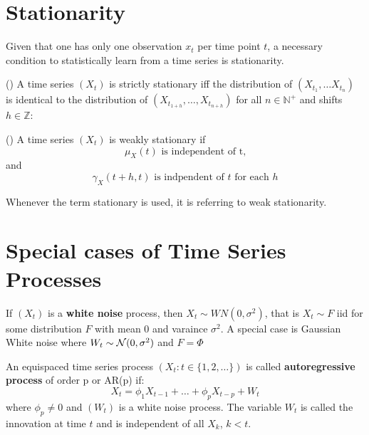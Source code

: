 \section{Stationarity}\label{sec:stationarity}

Given that one has only one observation $x_t$ per time point $t$,
a necessary condition to statistically learn from a time series is stationarity.

\begin{definition}(\citeauthor{brockwell_introduction_2016})
    A time series $(X_t)$ is strictly stationary iff
    the distribution of $(X_{t_1}, \dots X_{t_n})$ is identical to the distribution of
    $(X_{t_{1+h}}, \dots ,X_{t_{n+h}})$ for all $n \in \mathbb{N}^{+}$
    and shifts $h \in \mathbb{Z}$:
\end{definition}


\begin{definition}(\citeauthor{brockwell_introduction_2016})
    A time series $(X_t)$ is weakly stationary if
    \[
        \mu_X(t) \text{ is independent of t,}
    \]
    and
    \[
        \gamma_X(t+h, t) \text{ is indpendent of $t$ for each $h$}
    \]
\end{definition}

Whenever the term stationary is used, it is referring to weak stationarity.

\section{Special cases of Time Series Processes}\label{sec:example-of-time-series-processes}

\begin{example} If $(X_t)$ is a \textbf{white noise} process,
    then $X_t \sim WN(0, \sigma^2)$, that is $X_t \sim F$ iid for some
    distribution $F$ with mean $0$ and varaince $\sigma^2$. A special case is Gaussian White
    noise where $W_t \sim \operatorname{\mathcal{N}}(0, \sigma^2)$ and $F= \Phi$
\end{example}

\begin{example}
    An equispaced time series process $(X_t: t \in \{1,2, \dots\})$ is called \textbf{autoregressive process}
    of order p or AR(p) if:
    \[
        X_t = \phi_1 X_{t-1} + \dots + \phi_p X_{t-p} + W_t
    \]
    where $\phi_p \neq 0$ and $(W_t)$ is a white noise process.
    The variable $W_t$ is called the innovation at time $t$ and is independent of all $X_k$, $k < t$.
\end{example}

